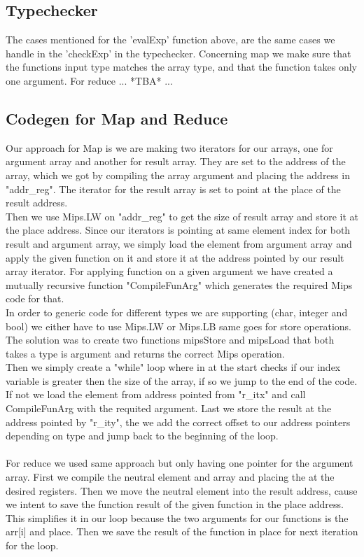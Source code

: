 \documentclass[12pt]{article}
\numberwithin{listing}{section}
\begin{document}
\subsection*{Typechecker}
The cases mentioned for the 'evalExp' function above, are the same cases we handle in the 'checkExp' in the typechecker. 
Concerning map we make sure that the functions input type matches the array type, and that the function takes only one argument. 
For reduce ...   *TBA*   ...


\subsection*{Codegen for Map and Reduce}
Our approach for Map is we are making two iterators for our arrays, one for argument array and another for result array. They are set to the address of the array, which we got by compiling the array argument and placing the address in "addr\_reg". The iterator for the result array is set to point at the place of the result address.\\
Then we use Mips.LW on "addr\_reg" to get the size of result array and store it at the place address. Since our iterators is pointing at same element index for both result and argument array, we simply load the element from argument array and apply the given function on it and store it at the address pointed by our result array iterator. For applying function on a given argument we have created a mutually recursive function "CompileFunArg" which generates the required Mips code for that.\\
In order to generic code for different types we are supporting (char, integer and bool) we either have to use Mips.LW or Mips.LB same goes for store operations. The solution was to create two functions mipsStore and mipsLoad that both takes a type is argument and returns the correct Mips operation.\\
Then we simply create a "while" loop where in at the start checks if our index variable is greater then the size of the array, if so we jump to the end of the code. If not we load the element from address pointed from "r\_itx" and call CompileFunArg with the requited argument. Last we store the result at the address pointed by "r\_ity", the we add the correct offset to our address pointers depending on type and jump back to the beginning of the loop. \\ \\
For reduce we used same approach but only having one pointer for the argument array. First we compile the neutral element and array and placing the at the desired registers. Then we move the neutral element into the result address, cause we intent to save the function result of the given function in the place address. This simplifies it in our loop because the two arguments for our functions is the arr[i] and place. Then we save the result of the function in place for next iteration for the loop.\\
\end{document}

